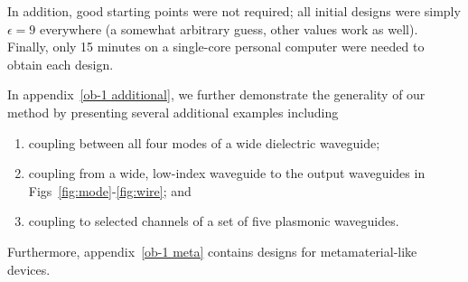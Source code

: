In addition, good starting points were not required; 
    all initial designs were simply $\epsilon = 9$ everywhere
    (a somewhat arbitrary guess, other values work as well).
Finally, only 15 minutes on a single-core personal computer
    were needed to obtain each design.

In appendix~\ref{ob-1 additional}, we further demonstrate the generality of our method
    by presenting several additional examples including
    \begin{enumerate}
    \item coupling between all four modes of a wide dielectric waveguide;
    \item coupling from a wide, low-index waveguide to the output waveguides in 
        Figs~\ref{fig:mode}-\ref{fig:wire}; and
    \item coupling to selected channels of a set of five plasmonic waveguides.
    \end{enumerate}

Furthermore, appendix~\ref{ob-1 meta} contains designs for metamaterial-like
    devices.

